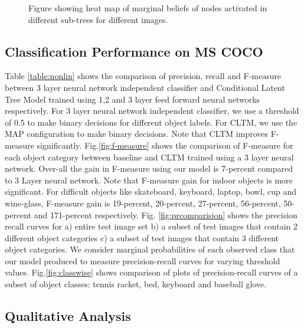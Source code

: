 \documentclass{article}
\begin{document}
\begin{figure*}[t]





\caption{Figure showing heat map of marginal beliefs of nodes activated in different sub-trees for different images. }
\end{figure*}



\subsection{Classification Performance on MS COCO}

Table \ref{table:nonlin} shows the comparison of precision, recall and F-measure between 3 layer neural network independent classifier and Conditional Latent Tree Model trained using 1,2 and 3 layer feed forward neural networks respectively. For 3 layer neural network independent classifier, we use a threshold of 0.5 to make binary decisions for different object labels. For CLTM, we use the MAP configuration to make binary decisions. Note that CLTM improves F-measure significantly.  Fig.\ref{fig:f-measure} shows the
comparison of F-measure for each object category between baseline and CLTM trained using a 3 layer neural network.  Over-all the gain in F-measure using our model is 7-percent compared to 3 Layer neural network. Note that F-measure gain for indoor objects is more significant. For difficult objects like skateboard, keyboard, laptop, bowl, cup and wine-glass,  F-measure gain is 19-percent, 20-percent, 27-percent, 56-percent, 50-percent and 171-percent respectively. Fig. \ref{fig:prcomparision} shows the precision recall curves for a) entire test image set b) a subset of test images that contain 2 different object categories c) a subset of test images that contain 3 different object categories. We consider marginal probabilities of each observed class that our model produced to measure precision-recall curves for varying threshold values. Fig.\ref{fig:classwise} shows comparison of plots of precision-recall curves of a subset of object classes: tennis racket, bed, keyboard and baseball glove.




\subsection{Qualitative Analysis}
\end{document}
